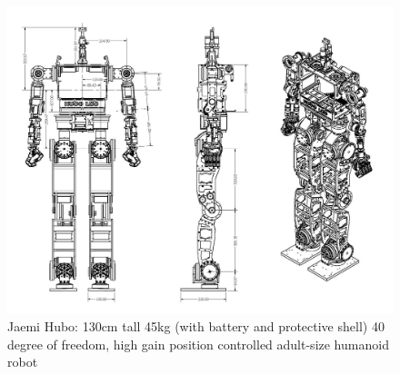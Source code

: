 \begin{figure}[thpb]
  \centering
\includegraphics[width=1.0\columnwidth]{./pix/huboSch.png}
  \caption{Jaemi Hubo: 130cm tall 45kg (with battery and protective shell) 40
		degree of freedom, high gain position controlled adult-size humanoid robot
	}
  \label{fig:huboSch}
\end{figure}
